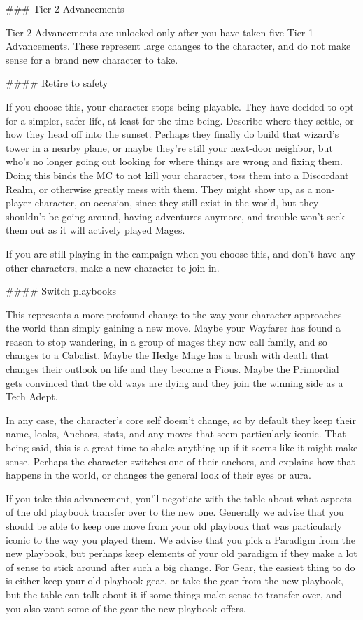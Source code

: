 \documentclass[
  oneside,
  statementpaper,
  9pt]{memoir}
\begin{document}
\begin{Player}
### Tier 2 Advancements

Tier 2 Advancements are unlocked only after you have taken five Tier 1 Advancements. These represent large changes to the character, and do not make sense for a brand new character to take. 

#### Retire to safety

If you choose this, your character stops being playable. They have decided to opt for a simpler, safer life, at least for the time being. Describe where they settle, or how they head off into the sunset. Perhaps they finally do build that wizard's tower in a nearby plane, or maybe they're still your next-door neighbor, but who's no longer going out looking for where things are wrong and fixing them. Doing this binds the MC to not kill your character, toss them into a Discordant Realm, or otherwise greatly mess with them. They might show up, as a non-player character, on occasion, since they still exist in the world, but they shouldn’t be going around, having adventures anymore, and trouble won’t seek them out as it will actively played Mages.

If you are still playing in the campaign when you choose this, and don’t have any other characters, make a new character to join in.

#### Switch playbooks

This represents a more profound change to the way your character approaches the world than simply gaining a new move. Maybe your Wayfarer has found a reason to stop wandering, in a group of mages they now call family, and so changes to a Cabalist. Maybe the Hedge Mage has a brush with death that changes their outlook on life and they become a Pious. Maybe the Primordial gets convinced that the old ways are dying and they join the winning side as a Tech Adept.

In any case, the character’s core self doesn’t change, so by default they keep their name, looks, Anchors, stats, and any moves that seem particularly iconic. That being said, this is a great time to shake anything up if it seems like it might make sense. Perhaps the character switches one of their anchors, and explains how that happens in the world, or changes the general look of their eyes or aura.

If you take this advancement, you'll negotiate with the table about what aspects of the old playbook transfer over to the new one. Generally we advise that you should be able to keep one move from your old playbook that was particularly iconic to the way you played them. We advise that you pick a Paradigm from the new playbook, but perhaps keep elements of your old paradigm if they make a lot of sense to stick around after such a big change. For Gear, the easiest thing to do is either keep your old playbook gear, or take the gear from the new playbook, but the table can talk about it if some things make sense to transfer over, and you also want some of the gear the new playbook offers. 


\end{Player}
\end{document}
